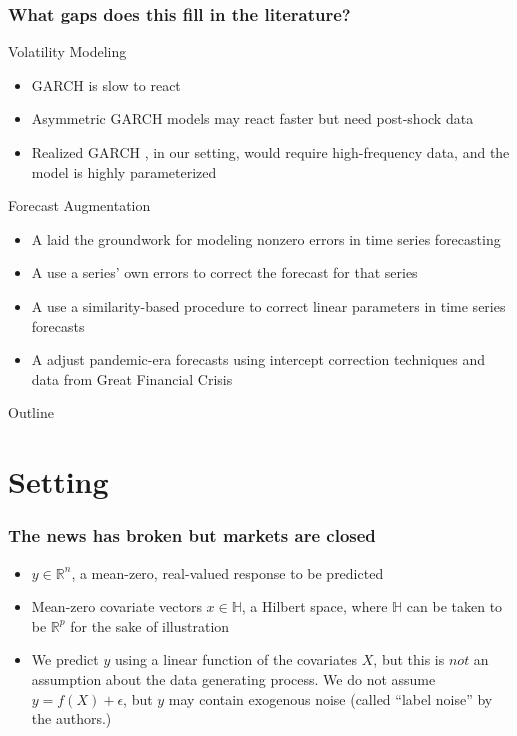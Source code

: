 \documentclass[pdf]{beamer}
\begin{document}
\begin{frame}
    \frametitle{What gaps does this fill in the literature?}
    
    Volatility Modeling
    \begin{itemize}
        \item GARCH is slow to react \citep{andersen2003modeling}
        \item Asymmetric GARCH models may react faster but need post-shock data 
        \item Realized GARCH \citep{hansen2012realized}, in our setting, would require high-frequency data, and the model is highly parameterized 
    \end{itemize}

    Forecast Augmentation
    \begin{itemize}
        \item A \citet{clements1996intercept,clements1998forecasting} laid the groundwork for modeling nonzero errors in time series forecasting
        \item A \citet{guerron2017macroeconomic} use a series' own errors to correct the forecast for that series
        \item A \citet{dendramis2020similarity} use a similarity-based procedure to correct linear parameters in time series forecasts
        \item A \citet{foroni2022forecasting} adjust pandemic-era forecasts using intercept correction techniques and data from Great Financial Crisis
    \end{itemize} 
\end{frame}

\begin{frame}{Outline}
    \tableofcontents
\end{frame}

\section{Setting}

\begin{frame}
\frametitle{The news has broken but markets are closed}

\begin{itemize}
\item $y\in \mathbb{R}^{n}$, a mean-zero, real-valued response to be predicted 
\item Mean-zero covariate vectors $x \in \mathbb{H}$, a Hilbert space, where $\mathbb{H}$ can be taken to be $\mathbb{R}^{p}$ for the sake of illustration
\item We predict $y$ using a linear function of the covariates $X$, but this is $\textit{not}$ an assumption about the data generating process.  We do not assume  $y = f(X) + \epsilon$, but $y$ may contain exogenous noise (called ``label noise'' by the authors.)
\end{itemize}
\end{frame}
\end{document}
